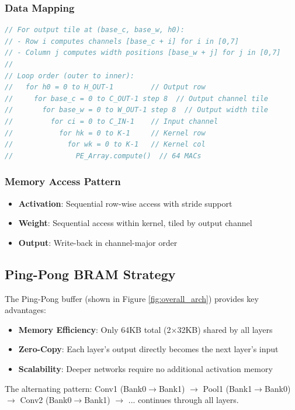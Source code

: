 \documentclass[11pt,a4paper]{article}
\begin{document}
\subsubsection{Data Mapping}
\begin{lstlisting}[language=Verilog, caption=PE Array Data Mapping]
// For output tile at (base_c, base_w, h0):
// - Row i computes channels [base_c + i] for i in [0,7]
// - Column j computes width positions [base_w + j] for j in [0,7]
// 
// Loop order (outer to inner):
//   for h0 = 0 to H_OUT-1         // Output row
//     for base_c = 0 to C_OUT-1 step 8  // Output channel tile
//       for base_w = 0 to W_OUT-1 step 8  // Output width tile
//         for ci = 0 to C_IN-1    // Input channel
//           for hk = 0 to K-1     // Kernel row
//             for wk = 0 to K-1   // Kernel col
//               PE_Array.compute()  // 64 MACs
\end{lstlisting}

\subsubsection{Memory Access Pattern}
\begin{itemize}
    \item \textbf{Activation}: Sequential row-wise access with stride support
    \item \textbf{Weight}: Sequential access within kernel, tiled by output channel
    \item \textbf{Output}: Write-back in channel-major order
\end{itemize}

\subsection{Ping-Pong BRAM Strategy}

The Ping-Pong buffer (shown in Figure \ref{fig:overall_arch}) provides key advantages:
\begin{itemize}
    \item \textbf{Memory Efficiency}: Only 64KB total (2×32KB) shared by all layers
    \item \textbf{Zero-Copy}: Each layer's output directly becomes the next layer's input
    \item \textbf{Scalability}: Deeper networks require no additional activation memory
\end{itemize}

\noindent The alternating pattern: Conv1 (Bank0$\to$Bank1) $\to$ Pool1 (Bank1$\to$Bank0) $\to$ Conv2 (Bank0$\to$Bank1) $\to$ ... continues through all layers.
\end{document}
